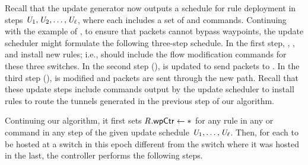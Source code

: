 Recall that the update generator now outputs a schedule for rule
deployment in \updateSteps steps $\mathit{U}_{1}, \mathit{U}_{2}, \ldots,
\mathit{U}_{\mathit{\ell}}$, where each \updateID{\updateIdx} includes a
set of \flowAdd and \flowDel commands.  Continuing with the example of
, to ensure that packets cannot bypass
waypoints, the update scheduler might formulate the following
three-step schedule.  In the first step, , ,
and  install new rules; i.e.,  should include
the flow modification commands for these three switches.  In the
second step (),  is updated to send packets to
.  In the third step (),  is
modified and packets are sent through the new path.  Recall that these
update steps include commands output by the update scheduler to
install rules to route the tunnels generated in the previous step of
our algorithm.

Continuing our algorithm, it first sets $\ruleID{}{\wpField} \gets
\ast$ for any rule  in any \flowAdd or \flowDel command
in any step of the given update schedule $\mathit{U}_{1}, \ldots,
\mathit{U}_{\mathit{\ell}}$.  Then, for each \nfID{\nfIdx} to be hosted
at a switch \newSwitchID{\nfIdx} in this epoch different from the
switch \oldSwitchID{\nfIdx} where it was hosted in the last, the
controller performs the following steps.

